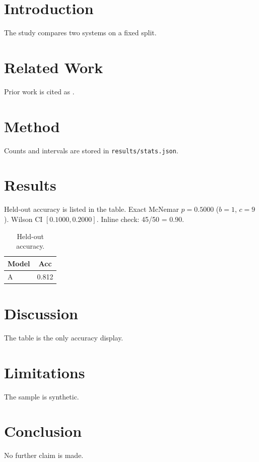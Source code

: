 \documentclass{article}
\begin{document}
\begin{abstract}
Synthetic submission used only as a mechanical-check fixture.
\end{abstract}
\section{Introduction}
The study compares two systems on a fixed split.
\section{Related Work}
Prior work is cited as \cite{vaswani2017}.
\section{Method}
Counts and intervals are stored in \texttt{results/stats.json}.

\section{Results}
Held-out accuracy is listed in the table.
Exact McNemar $p=0.5000$ ($b=1$, $c=9$).
Wilson CI $[0.1000, 0.2000]$.
Inline check: 45/50 = 0.90.

\begin{table}
\caption{Held-out accuracy.}
\label{tab:acc}
\begin{tabular}{lc}
\toprule
Model & Acc \\
\midrule
A & 0.812 \\
\bottomrule
\end{tabular}
\end{table}
\section{Discussion}
The table is the only accuracy display.
\section{Limitations}
The sample is synthetic.
\section{Conclusion}
No further claim is made.
\end{document}
